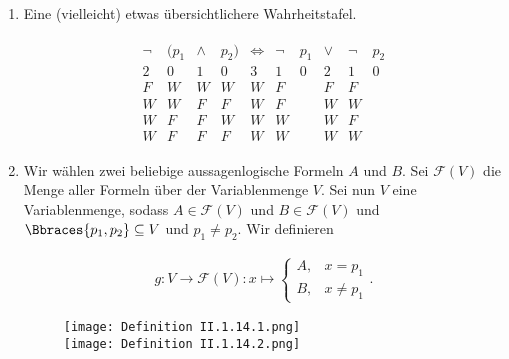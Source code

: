 
\begin{solution}

\begin{enumerate}[label = \alph*.]

    \item Eine (vielleicht) etwas übersichtlichere Wahrheitstafel.

    \begin{align*}
        \begin{array}{cccccccccc}
            \neg & (p_1 & \land & p_2) & \iff & \neg & p_1 & \lor & \neg & p_2 \\
            \hline
            2 & 0 & 1 & 0 & 3 & 1 & 0 & 2 & 1 & 0 \\
            \hline
            F & W & W & W & W & F & & F & F & \\
            W & W & F & F & W & F & & W & W & \\
            W & F & F & W & W & W & & W & F & \\
            W & F & F & F & W & W & & W & W &
        \end{array}
    \end{align*}

    \item Wir wählen zwei beliebige aussagenlogische Formeln $A$ und $B$.
    Sei $\mathcal{F}(V)$ die Menge aller Formeln über der Variablenmenge $V$.
    Sei nun $V$ eine Variablenmenge, sodass $A \in \mathcal{F}(V)$ und $B \in \mathcal{F}(V)$ und $\Bbraces{p_1, p_2} \subseteq V$ und $p_1 \neq p_2$.
    Wir definieren

    \begin{align*}
        g:
        V \to \mathcal{F}(V):
        x \mapsto
        \begin{cases}
            A, & x = p_1 \\
            B, & x \neq p_1
        \end{cases}.
    \end{align*}
    

    \begin{figure}[h!]
        \begin{boxedin}
            \begin{center}
                \texttt{[image: Definition II.1.14.1.png]} \\
                \texttt{[image: Definition II.1.14.2.png]}
            \end{center}
        \end{boxedin}
    \end{figure}


\end{enumerate}
\end{solution}
